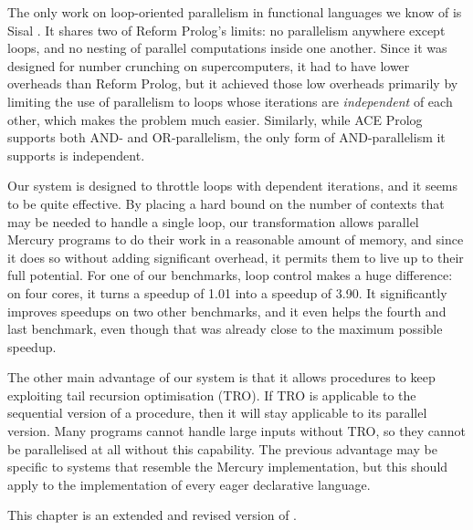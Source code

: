 The only work on loop-oriented parallelism in functional languages
we know of is Sisal \citep{feo:1990:sisal-report}.
It shares two of Reform Prolog's limits:
no parallelism anywhere except loops, and
no nesting of parallel computations inside one another.
Since it was designed for number crunching on supercomputers,
it had to have lower overheads than Reform Prolog,
but it achieved those low overheads
primarily by limiting the use of parallelism
to loops whose iterations are \emph{independent} of each other,
which makes the problem much easier.
Similarly, while ACE Prolog supports both AND- and OR-parallelism,
the only form of AND-parallelism it supports is independent.

Our system is designed to throttle loops with dependent iterations,
and it seems to be quite effective.
By placing a hard bound on the number of contexts
that may be needed to handle a single loop,
our transformation allows parallel Mercury programs
to do their work in a reasonable amount of memory,
and since it does so without adding significant overhead,
it permits them to live up to their full potential.
For one of our benchmarks,
loop control makes a huge difference:
on four cores, it turns a speedup of 1.01 into a speedup of 3.90.
It significantly improves speedups on two other benchmarks,
and it even helps the fourth and last benchmark,
even though that was already close to the maximum possible speedup.

The other main advantage of our system
is that it allows procedures to keep exploiting tail recursion optimisation
(TRO).
If TRO is applicable to the sequential version of a procedure,
then it will stay applicable to its parallel version.
Many programs cannot handle large inputs without TRO,
so they cannot be parallelised at all without this capability.
The previous advantage may be specific
to systems that resemble the Mercury implementation,
but this should apply to the implementation
of every eager declarative language.

This chapter is an extended and revised version of
\citet{bone:2012:loop_control}.


%
%
%
%

